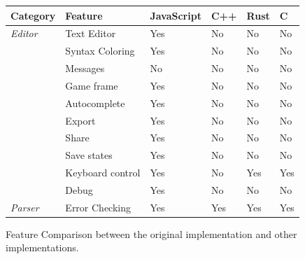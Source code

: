\begin{figure}[!t]
    \centering
    \caption{Feature Comparison between the original implementation and other implementations.}
\begin{tabular}{p{2cm}|p{3cm}|p{2cm}|p{2cm}|p{2cm}|p{2cm}}
\small
    \textbf{Category} & \textbf{Feature}    & \textbf{JavaScript}   & \textbf{C++}                 & \textbf{Rust}           & \textbf{C}                    \\ \hline
    \textit{Editor}   & Text Editor         & Yes                   & No                           & No                      & No                            \\
                      & Syntax Coloring     & Yes                   & No                           & No                      & No                            \\
                      & Messages            & No                    & No                           & No                      & No                            \\
                      & Game frame          & Yes                   & No                           & No                      & No                            \\
                      & Autocomplete        & Yes                   & No                           & No                      & No                            \\
                      & Export              & Yes                   & No                           & No                      & No                            \\
                      & Share               & Yes                   & No                           & No                      & No                            \\
                      & Save states         & Yes                   & No                           & No                      & No                            \\
                      & Keyboard control    & Yes                   & No                           & Yes                     & Yes                           \\
                      & Debug               & Yes                   & No                           & No                      & No                            \\
    \textit{Parser}   & Error Checking      & Yes                   & Yes                          & Yes                     & Yes                           \\

\end{tabular}
\end{figure}

